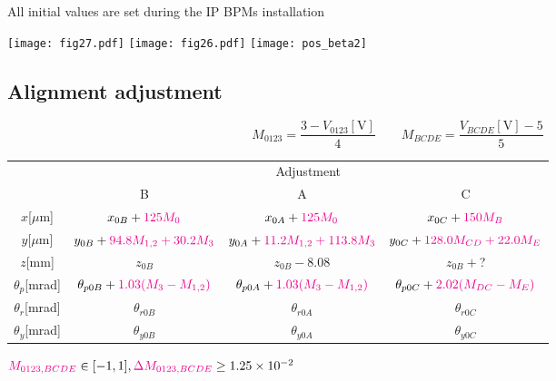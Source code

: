 \vspace*{-0.4cm}All initial values are set during the IP BPMs installation\par
\texttt{[image: fig27.pdf]}
\texttt{[image: fig26.pdf]}
\texttt{[image: pos\_beta2]}
\raggedright

\subsection{Alignment adjustment}
\centering
\begin{equation}
 M_{0123}=\frac{3-V_{0123}[\text{V}]}{4} \qquad M_{BCDE}=\frac{V_{BCDE}[\text{V}]-5}{5}
\end{equation}
\begin{tabular}{|c||c|c|c|}\hline
 &\multicolumn{3}{|c|}{Adjustment}\\\cline{2-4}
 & B & A & C\\\hline\hline
$x$[$\mu$m] & $x_{0B}+{\color{magenta}125M_0}$ & $x_{0A}+{\color{magenta}125M_0}$&${x_{0C}+\color{magenta}150M_{B}}$\\
$y$[$\mu$m]& $y_{0B}+{\color{magenta}94.8M_{1,2}+30.2M_3}$&$y_{0A}+{\color{magenta}11.2M_{1,2}+113.8M_3}$&$y_{0C}+{\color{magenta}128.0M_{CD}+22.0M_E}$\\
$z$[mm]&$z_{0B}$&$z_{0B}-8.08$&$z_{0B}+$?\\
$\theta_{p}$[mrad]& $\theta_{p0B}+{\color{magenta}1.03(M_3-M_{1,2})}$ & $\theta_{p0A}+{\color{magenta}1.03(M_3-M_{1,2})}$ &$\theta_{p0C}+{\color{magenta} 2.02(M_{DC}-M_E)}$\\
$\theta_{r}$[mrad]&$\theta_{r0B}$&$\theta_{r0A}$&$\theta_{r0C}$\\
$\theta_{y}$[mrad]&$\theta_{y0B}$&$\theta_{y0A}$&$\theta_{y0C}$\\\hline
\end{tabular}\par
${\color{magenta} M_{0123,BCDE}}\in[-1,1],{\color{magenta}\Delta M_{0123,BCDE}}\geq1.25\times 10^{-2}$

